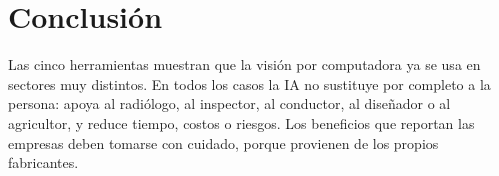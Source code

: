 \documentclass[11pt,letterpaper]{article}
\begin{document}
\section{Conclusión}

Las cinco herramientas muestran que la visión por computadora ya se usa en sectores muy distintos. En todos los casos la IA no sustituye por completo a la persona: apoya al radiólogo, al inspector, al conductor, al diseñador o al agricultor, y reduce tiempo, costos o riesgos. Los beneficios que reportan las empresas deben tomarse con cuidado, porque provienen de los propios fabricantes.

\end{document}
